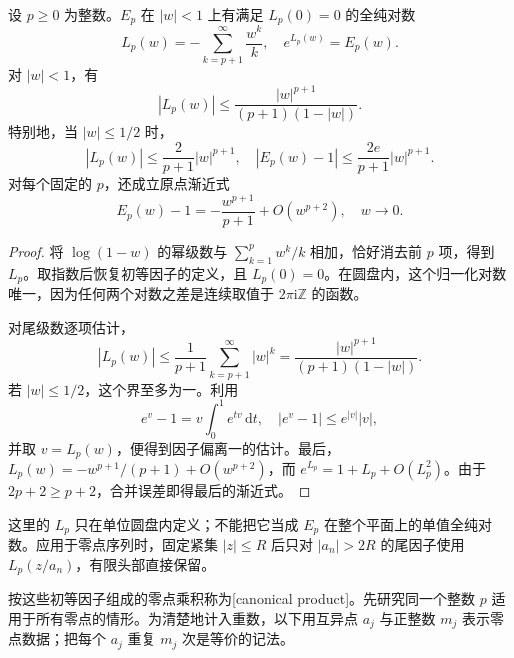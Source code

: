 \begin{lemma}[初等因子的对数尾界]\label{b3:lem:20-elementary-tail}
设 \(p\ge0\) 为整数。\(E_p\) 在 \(|w|<1\) 上有满足 \(L_p(0)=0\) 的全纯对数
\[
 L_p(w)=-\sum_{k=p+1}^{\infty}\frac{w^k}{k},\quad
 e^{L_p(w)}=E_p(w).
\]
对 \(|w|<1\)，有
\[
 |L_p(w)|\le\frac{|w|^{p+1}}{(p+1)(1-|w|)}.
\]
特别地，当 \(|w|\le1/2\) 时，
\[
 |L_p(w)|\le\frac{2}{p+1}|w|^{p+1},\quad
 |E_p(w)-1|\le\frac{2e}{p+1}|w|^{p+1}.
\]
对每个固定的 \(p\)，还成立原点渐近式
\[
 E_p(w)-1=-\frac{w^{p+1}}{p+1}+O(w^{p+2}),\quad w\to0.
\]
\end{lemma}
\begin{proof}
将 \(\log(1-w)\) 的幂级数与 \(\sum_{k=1}^p w^k/k\) 相加，恰好消去前 \(p\) 项，得到 \(L_p\)。取指数后恢复初等因子的定义，且 \(L_p(0)=0\)。在圆盘内，这个归一化对数唯一，因为任何两个对数之差是连续取值于 \(2\pi\mathrm{i}\mathbb Z\) 的函数。

对尾级数逐项估计，
\[
 |L_p(w)|
 \le\frac1{p+1}\sum_{k=p+1}^{\infty}|w|^k
 =\frac{|w|^{p+1}}{(p+1)(1-|w|)}.
\]
若 \(|w|\le1/2\)，这个界至多为一。利用
\[
 e^v-1=v\int_0^1e^{tv}\,\mathrm{d}t,
 \quad |e^v-1|\le e^{|v|}|v|,
\]
并取 \(v=L_p(w)\)，便得到因子偏离一的估计。最后，\(L_p(w)=-w^{p+1}/(p+1)+O(w^{p+2})\)，而 \(e^{L_p}=1+L_p+O(L_p^2)\)。由于 \(2p+2\ge p+2\)，合并误差即得最后的渐近式。
\end{proof}
这里的 \(L_p\) 只在单位圆盘内定义；不能把它当成 \(E_p\) 在整个平面上的单值全纯对数。应用于零点序列时，固定紧集 \(|z|\le R\) 后只对 \(|a_n|>2R\) 的尾因子使用 \(L_p(z/a_n)\)，有限头部直接保留。

\ProseParagraphBreak

按这些初等因子组成的零点乘积称为[canonical product]。先研究同一个整数 \(p\) 适用于所有零点的情形。为清楚地计入重数，以下用互异点 \(a_j\) 与正整数 \(m_j\) 表示零点数据；把每个 \(a_j\) 重复 \(m_j\) 次是等价的记法。

